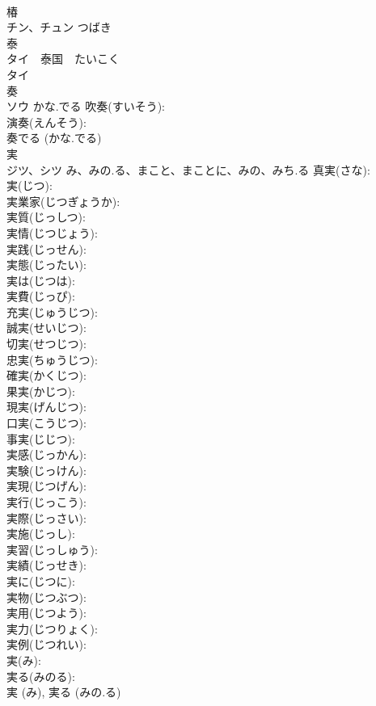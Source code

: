 \documentclass[8pt]{extreport}
\begin{document}
\begin{CJK}{UTF8}{min}
\\	椿			
\\	チン、チュン	つばき		
\\	泰			
\\	タイ　泰国　たいこく 
\\	タイ			
\\	奏			
\\	ソウ	かな.でる	吹奏(すいそう): 
\\	演奏(えんそう): 
\\	奏でる (かな.でる)
\\	実			
\\	ジツ、シツ	み、みの.る、まこと、まことに、みの、みち.る	真実(さな): 
\\	実(じつ): 
\\	実業家(じつぎょうか): 
\\	実質(じっしつ): 
\\	実情(じつじょう): 
\\	実践(じっせん): 
\\	実態(じったい): 
\\	実は(じつは): 
\\	実費(じっぴ): 
\\	充実(じゅうじつ): 
\\	誠実(せいじつ): 
\\	切実(せつじつ): 
\\	忠実(ちゅうじつ): 
\\	確実(かくじつ): 
\\	果実(かじつ): 
\\	現実(げんじつ): 
\\	口実(こうじつ): 
\\	事実(じじつ): 
\\	実感(じっかん): 
\\	実験(じっけん): 
\\	実現(じつげん): 
\\	実行(じっこう): 
\\	実際(じっさい): 
\\	実施(じっし): 
\\	実習(じっしゅう): 
\\	実績(じっせき): 
\\	実に(じつに): 
\\	実物(じつぶつ): 
\\	実用(じつよう): 
\\	実力(じつりょく): 
\\	実例(じつれい): 
\\	実(み): 
\\	実る(みのる): 
\\	実 (み), 実る (みの.る)

\end{CJK}
\end{document}
